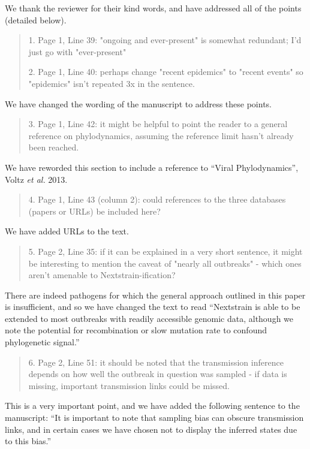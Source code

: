 \documentclass[12pt,a4paper]{article}
\begin{document}
We thank the reviewer for their kind words, and have addressed all of the points (detailed below).

\begin{quote}
1. Page 1, Line 39: "ongoing and ever-present" is somewhat redundant; I'd just go with "ever-present"

2. Page 1, Line 40: perhaps change "recent epidemics" to "recent events" so "epidemics" isn't repeated 3x in the sentence.
\end{quote}
We have changed the wording of the manuscript to address these points. 

\begin{quote}
3. Page 1, Line 42: it might be helpful to point the reader to a general reference on phylodynamics, assuming the reference limit hasn't already been reached.
\end{quote}
We have reworded this section to include a reference to ``Viral Phylodynamics'', Voltz \textit{et al.} 2013.

\begin{quote}
4. Page 1, Line 43 (column 2): could references to the three databases (papers or URLs) be included here?
\end{quote}
We have added URLs to the text.

\begin{quote}
5. Page 2, Line 35: if it can be explained in a very short sentence, it might be interesting to mention the caveat of "nearly all outbreaks" - which ones aren't amenable to Nextstrain-ification?
\end{quote}
There are indeed pathogens for which the general approach outlined in this paper is insufficient, and so we have changed the text to read ``Nextstrain is able to be extended to most outbreaks with readily accessible genomic data, although we note the potential for recombination or slow mutation rate to confound phylogenetic signal.''


\begin{quote}
6. Page 2, Line 51: it should be noted that the transmission inference depends on how well the outbreak in question was sampled - if data is missing, important transmission links could be missed.
\end{quote}
This is a very important point, and we have added the following sentence to the manuscript: ``It is important to note that sampling bias can obscure transmission links, and in certain cases we have chosen not to display the inferred states due to this bias.''
\end{document}
